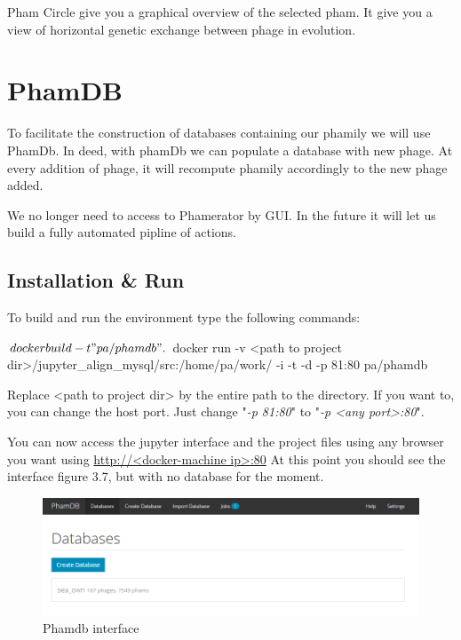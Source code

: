 \documentclass[a4paper,11pt]{report}
\begin{document}
Pham Circle give you a graphical overview of the selected pham. It give you a view of horizontal genetic exchange between phage in evolution.

\section{PhamDB}
To facilitate the construction of databases containing our phamily we will use PhamDb. In deed, with phamDb we can populate a database with new phage. At every addition of phage, it will recompute phamily accordingly to the new phage added. 

We no longer need to access to Phamerator by GUI. In the future it will let us build a fully automated pipline of actions.

\subsection{Installation \& Run}
To build and run the environment type the following commands:
\begin{javacode}
$ docker build -t "pa/phamdb" .
$ docker run -v <path to project dir>/jupyter_align_mysql/src:/home/pa/work/ -i -t -d -p 81:80 pa/phamdb
\end{javacode}

Replace <path to project dir> by the entire path to the directory. If you want to, you can change the host port. Just change "\textit{-p 81:80}" to "\textit{-p <any port>:80}".

You can now access the jupyter interface and the project files using any browser you want using \url{http://<docker-machine ip>:80}
\newpage
At this point you should see the interface figure 3.7, but with no database for the moment.

\begin{figure}[H] 
	\begin{center}
		\includegraphics[scale=0.45]{img/phamdb}
		\caption{Phamdb interface}
	\end{center}
\end{figure}
\end{document}
